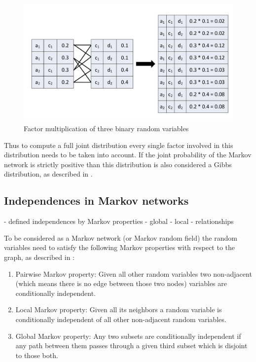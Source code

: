 \begin{figure}[htpb]
  \centering
  	\includegraphics[scale=0.4]{img/parammult.pdf} 
  \caption{Factor multiplication of three binary random variables}
  \label{fig:parammult}
\end{figure}

Thus to compute a full joint distribution every single factor involved in this distribution needs to be taken into account. If the joint probability of the Markov network is strictly positive than this distribution is also considered a Gibbs distribution, as described in \cite{kindermann1980markov}.

\subsection{Independences in Markov networks} \label{sec:indep}

- defined independences by Markov properties
- global
- local
- relationships

To be considered as a Markov network (or Markov random field) the random variables need to satisfy the following Markov properties with respect to the graph, as described in \cite{markov1957theory}:

\begin{enumerate}
\item Pairwise Markov property: Given all other random variables two non-adjacent (which means there is no edge between those two nodes) variables are conditionally independent.
\item Local Markov property: Given all its neighbors a random variable is conditionally independent of all other non-adjacent random variables.
\item Global Markov property: Any two subsets are conditionally independent if any path between them passes through a given third subset which is disjoint to those both.  
\end{enumerate}


